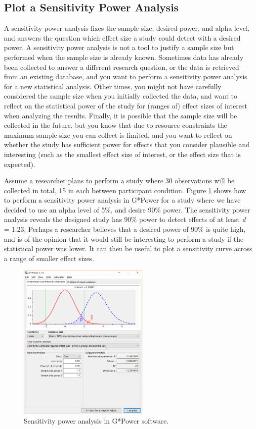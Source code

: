 \documentclass[
  english,
  ,jou, a4paper,floatsintext]{apa6}
\begin{document}
\hypertarget{plot-a-sensitivity-power-analysis}{%
\subsection{Plot a Sensitivity Power Analysis}\label{plot-a-sensitivity-power-analysis}}

A sensitivity power analysis fixes the sample size, desired power, and alpha level, and answers the question which effect size a study could detect with a desired power. A sensitivity power analysis is not a tool to justify a sample size but performed when the sample size is already known. Sometimes data has already been collected to answer a different research question, or the data is retrieved from an existing database, and you want to perform a sensitivity power analysis for a new statistical analysis. Other times, you might not have carefully considered the sample size when you initially collected the data, and want to reflect on the statistical power of the study for (ranges of) effect sizes of interest when analyzing the results. Finally, it is possible that the sample size will be collected in the future, but you know that due to resource constraints the maximum sample size you can collect is limited, and you want to reflect on whether the study has sufficient power for effects that you consider plausible and interesting (such as the smallest effect size of interest, or the effect size that is expected).

Assume a researcher plans to perform a study where 30 observations will be collected in total, 15 in each between participant condition. Figure \ref{fig:gsens0} shows how to perform a sensitivity power analysis in G*Power for a study where we have decided to use an alpha level of 5\%, and desire 90\% power. The sensitivity power analysis reveals the designed study has 90\% power to detect effects of at least \emph{d} = 1.23. Perhaps a researcher believes that a desired power of 90\% is quite high, and is of the opinion that it would still be interesting to perform a study if the statistical power was lower. It can then be useful to plot a sensitivity curve across a range of smaller effect sizes.

\begin{figure}
\includegraphics[width=240px]{images/gpow_sensitivity_1} \caption{Sensitivity power analysis in G*Power software.}\label{fig:gsens0}
\end{figure}
\end{document}
